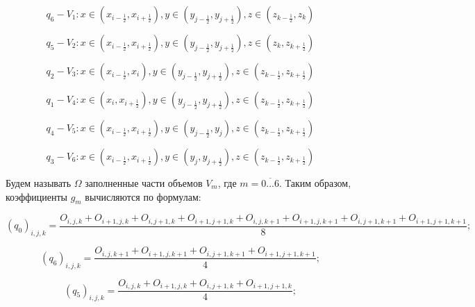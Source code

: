 \documentclass[12pt]{article}
\begin{document}
\begin{equation*}
{q_6} - {V_1}: x\in (x_{i-\frac{1}{2} }, x_{i+\frac{1}{2} } ),  y\in (y_{j-\frac{1}{2} }, y_{j+\frac{1}{2} } ),  z\in (z_{k-\frac{1}{2} }, z_k )
\end{equation*}

\begin{equation*}
{q_5} - {V_2}: x\in (x_{i-\frac{1}{2} }, x_{i+\frac{1}{2} } ),  y\in (y_{j-\frac{1}{2} }, y_{j+\frac{1}{2} } ),  z\in (z_k, z_{k+\frac{1}{2} } )
\end{equation*}

\begin{equation*}
{q_2} - {V_3}: x\in (x_{i-\frac{1}{2} }, x_i ),  y\in (y_{j-\frac{1}{2} }, y_{j+\frac{1}{2} } ),  z\in (z_{k-\frac{1}{2} }, z_{k+\frac{1}{2} } )
\end{equation*}

\begin{equation*}
{q_1} - {V_4}: x\in (x_i, x_{i+\frac{1}{2} } ),  y\in (y_{j-\frac{1}{2} }, y_{j+\frac{1}{2} } ),  z\in (z_{k-\frac{1}{2} }, z_{k+\frac{1}{2} } )
\end{equation*}

\begin{equation*}
{q_4} - {V_5}: x\in (x_{i-\frac{1}{2} }, x_{i+\frac{1}{2} } ),  y\in (y_{j-\frac{1}{2} }, y_j ),  z\in (z_{k-\frac{1}{2} }, z_{k+\frac{1}{2} } )
\end{equation*}

\begin{equation*}
{q_3} - {V_6}: x\in (x_{i-\frac{1}{2} }, x_{i+\frac{1}{2} } ),  y\in (y_j, y_{j+\frac{1}{2} } ),  z\in (z_{k-\frac{1}{2} }, z_{k+\frac{1}{2} } )
\end{equation*}

Будем называть $\Omega$ заполненные части объемов $V_m$, где $m=\overline{0...6}$. 
Таким образом, коэффициенты $g_m$ вычисляются по формулам:

\begin{equation*}
(q_0)_{i,j,k}=\frac{O_{i,j,k}+O_{i+1,j,k}+O_{i,j+1,k}+O_{i+1,j+1,k}+O_{i,j,k+1}+O_{i+1,j,k+1}+O_{i,j+1,k+1}+O_{i+1,j+1,k+1}}{8};
\end{equation*}

\begin{equation*}
 (q_6)_{i,j,k}=\frac{O_{i,j,k+1}+O_{i+1,j,k+1}+O_{i,j+1,k+1}+O_{i+1,j+1,k+1}}{4};
\end{equation*}

\begin{equation*}
(q_5)_{i,j,k}=\frac{O_{i,j,k}+O_{i+1,j,k}+O_{i,j+1,k}+O_{i+1,j+1,k}}{4};
\end{equation*}
\end{document}
